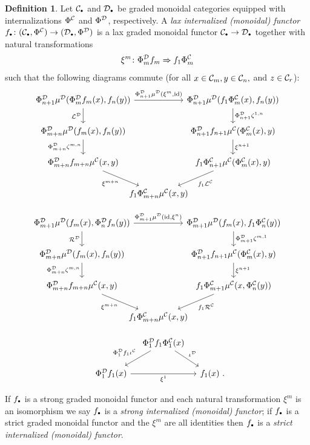 \documentclass[openany, amssymb, psamsfonts]{amsart}
\theoremstyle{definition}
\newtheorem{defn}{Definition}[section]
\numberwithin{equation}{section}
\begin{document}
\begin{defn}
Let $\C_\sbull$ and $\D_\sbull$ be graded monoidal categories equipped with internalizations $\Phi^{\mathcal{C}}$ and $\Phi^{\mathcal{D}}$, respectively. A \emph{lax internalized (monoidal) functor} $f_\sbull \colon (\C_\sbull, \Phi^\C) \to (\D_\sbull, \Phi^\D)$ is a lax graded monoidal functor $\C_\sbull \to \D_\sbull$ together with natural transformations
$$
\xi^m \colon \Phi^{\mathcal{D}}_m f_m \Rightarrow f_1\Phi^{\mathcal{C}}_m
$$such that the following diagrams commute (for all $x \in \mathcal{C}_m, y \in \mathcal{C}_n,$ and $z \in \mathcal{C}_r$):
\begin{equation}
\begin{tikzcd}[column sep=-1em]
    \Phi_{n+1}^\D\mu^\D(\Phi_m^\D f_m(x), f_n(y)) \ar[rr, "{\Phi_{n+1}^\D\mu^\D(\xi^m, \id)}"] \ar[d, "{\calL^\D}"'] && \Phi_{n+1}^\D\mu^\D(f_1\Phi_m^\C(x), f_n(y)) \ar[d, "\Phi_{n+1}^\D\zeta^{1,n}"]\\
    \Phi^\D_{m+n}\mu^\D(f_m(x), f_n(y)) \ar[d, "{\Phi^\D_{m+n}\zeta^{m,n}}"'] && \Phi_{n+1}^\D f_{n+1} \mu^\C(\Phi_m^\C(x), y) \ar[d, "\xi^{n+1}"]\\
    \Phi^\D_{m+n}f_{m+n}\mu^\C(x,y) \ar[dr, "\xi^{m+n}"'] && f_1\Phi_{n+1}^\C \mu^\C(\Phi_m^\C(x), y) \ar[dl, "f_1\calL^\C"]\\
    & f_1\Phi^\C_{m+n}\mu^\C(x,y)
\end{tikzcd} \label{diag:lax-coh-left}
\end{equation}

\begin{equation}
\begin{tikzcd}[column sep=-1em]
    \Phi_{m+1}^\D\mu^\D(f_m(x), \Phi_n^\D f_n(y)) \ar[rr, "{\Phi_{m+1}^\D\mu^\D(\id, \xi^n)}"] \ar[d, "{\calR^\D}"'] && \Phi_{m+1}^\D\mu^\D(f_m(x), f_1\Phi_n^\C(y)) \ar[d, "\Phi_{m+1}^\D\zeta^{m,1}"]\\
    \Phi^\D_{m+n}\mu^\D(f_m(x), f_n(y)) \ar[d, "{\Phi^\D_{m+n}\zeta^{m,n}}"'] && \Phi_{n+1}^\D f_{n+1} \mu^\C(\Phi_m^\C(x), y) \ar[d, "\xi^{n+1}"]\\
    \Phi^\D_{m+n}f_{m+n}\mu^\C(x,y) \ar[dr, "\xi^{m+n}"'] && f_1\Phi_{m+1}^\C \mu^\C(x, \Phi_n^\C(y)) \ar[dl, "f_1\calR^\C"]\\
    & f_1\Phi^\C_{m+n}\mu^\C(x,y)
\end{tikzcd} \label{diag:lax-coh-right}
\end{equation}

\begin{equation}
\begin{tikzcd}[column sep=1em]
    & \Phi^\D_1 f_1 \Phi^\C_1(x) \ar[dl, "\Phi^\D_1 f_1 \iota^\C"'] \ar[dr, "\iota^\D"] \\
    \Phi^\D_1 f_1(x) \ar[rr, "\xi^1"'] && f_1(x) \period
\end{tikzcd} \label{diag:lax-coh-triv}
\end{equation}

If $f_\sbull$ is a strong graded monoidal functor and each natural transformation $\xi^m$ is an isomorphism we say $f_\sbull$ is a \emph{strong internalized (monoidal) functor}; if $f_\sbull$ is a strict graded monoidal functor and the $\xi^m$ are all identities then $f_\sbull$ is a \emph{strict internalized (monoidal) functor}.
\end{defn}
\end{document}
